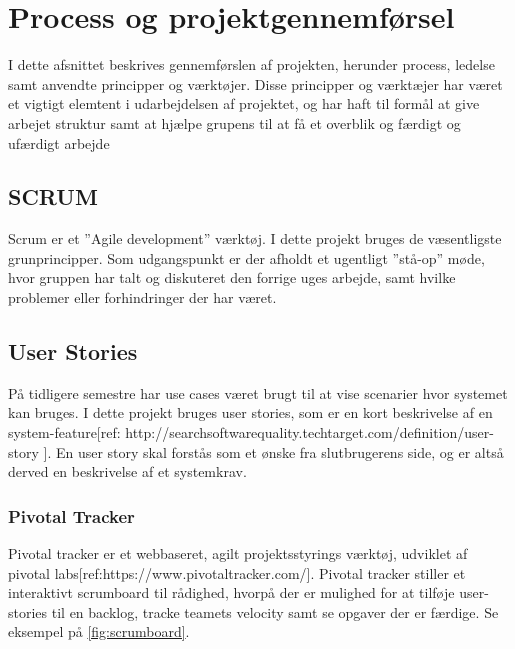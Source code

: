 \chapter{Process og projektgennemførsel}

I dette afsnittet beskrives gennemførslen af projekten, herunder process, ledelse samt anvendte principper og værktøjer. Disse principper og værktæjer har været et vigtigt elemtent i udarbejdelsen af projektet, og har haft til formål at give arbejet struktur samt at hjælpe grupens til at få et overblik og færdigt og ufærdigt arbejde

\section{SCRUM}
Scrum er et ”Agile development” værktøj. I dette projekt bruges de væsentligste grunprincipper. Som udgangspunkt er der afholdt et ugentligt ”stå-op” møde, hvor gruppen har talt og diskuteret den forrige uges arbejde, samt hvilke problemer eller forhindringer der har været.

\section{User Stories}
På tidligere semestre har use cases været brugt til at vise scenarier hvor systemet kan bruges. I dette projekt bruges user stories, som er en kort beskrivelse af en system-feature[ref: http://searchsoftwarequality.techtarget.com/definition/user-story ]. En user story skal forstås som et ønske fra slutbrugerens side, og er altså derved en beskrivelse af et systemkrav.

\subsection{Pivotal Tracker}
Pivotal tracker er et webbaseret, agilt projektsstyrings værktøj, udviklet af pivotal labs[ref:https://www.pivotaltracker.com/]. Pivotal tracker stiller et interaktivt scrumboard til rådighed, hvorpå der er mulighed for at tilføje user-stories til en backlog, tracke teamets velocity samt se opgaver der er færdige. Se eksempel på \ref{fig:scrumboard}.

